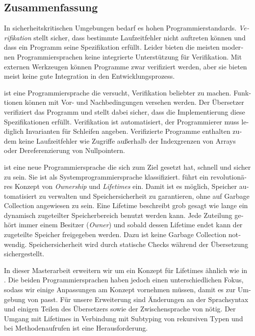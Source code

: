 \newpage

\begin{otherlanguage}{ngerman}
\section*{Zusammenfassung}
In sicherheitskritischen Umgebungen bedarf es hohen Programmierstandards.
\emph{Verifikation} stellt sicher, dass bestimmte Laufzeitfehler nicht auftreten können und dass ein Programm seine Spezifikation erfüllt.
Leider bieten die meisten modernen Programmiersprachen keine integrierte Unterstützung für Verifikation.
Mit externen Werkzeugen können Programme zwar verifiziert werden, aber sie bieten meist keine gute Integration in den Entwicklungsprozess.

\whiley ist eine Programmiersprache die versucht, Verifikation beliebter zu machen.
Funktionen können mit Vor- und Nachbedingungen versehen werden.
Der Übersetzer verifiziert das Programm und stellt dabei sicher, dass die Implementierung diese Spezifikationen erfüllt.
Verifikation ist automatisiert, der Programmierer muss lediglich Invarianten für Schleifen angeben.
Verifizierte \whiley Programme enthalten zudem keine Laufzeitfehler wie Zugriffe außerhalb der Indexgrenzen von Arrays oder Dereferenzierung von Nullpointern.

\rust ist eine neue Programmiersprache die sich zum Ziel gesetzt hat, schnell und sicher zu sein.
Sie ist als Systemprogrammiersprache klassifiziert.
\rust führt ein revolutionäres Konzept von \emph{Ownership} und \emph{Lifetimes} ein.
Damit ist es möglich, Speicher automatisiert zu verwalten und Speichersicherheit zu garantieren, ohne auf Garbage Collection angewiesen zu sein.
Eine Lifetime beschreibt grob gesagt wie lange ein dynamisch zugeteilter Speicherbereich benutzt werden kann.
Jede Zuteilung gehört immer einem Besitzer (\emph{Owner}) und sobald dessen Lifetime endet kann der zugeteilte Speicher freigegeben werden.
Dazu ist keine Garbage Collection notwendig.
Speichersicherheit wird durch statische Checks während der Übersetzung sichergestellt.

In dieser Masterarbeit erweitern wir \whiley um ein Konzept für Lifetimes ähnlich wie in \rust.
Die beiden Programmiersprachen haben jedoch einen unterschiedlichen Fokus, sodass wir einige Anpassungen am Konzept vornehmen müssen, damit es zur Umgebung von \whiley passt.
Für unsere Erweiterung sind Änderungen an der Sprachsyntax und einigen Teilen des Übersetzers sowie der Zwischensprache von \whiley nötig.
Der Umgang mit Lifetimes in Verbindung mit Subtyping von rekursiven Typen und bei Methodenaufrufen ist eine Herausforderung.


\end{otherlanguage}

